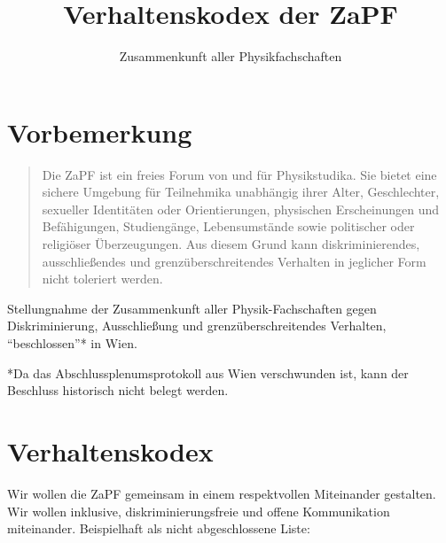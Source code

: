 \documentclass[
  a4paper,
  oneside]{scrartcl}
\title{Verhaltenskodex der ZaPF}
\author{Zusammenkunft aller Physikfachschaften}
\date{}
\begin{document}
\maketitle

\section{Vorbemerkung}\label{vorbemerkung}

\begin{quote}
Die ZaPF ist ein freies Forum von und für Physikstudika. Sie bietet eine
sichere Umgebung für Teilnehmika unabhängig ihrer Alter, Geschlechter,
sexueller Identitäten oder Orientierungen, physischen Erscheinungen und
Befähigungen, Studiengänge, Lebensumstände sowie politischer oder
religiöser Überzeugungen. Aus diesem Grund kann diskriminierendes,
ausschließendes und grenzüberschreitendes Verhalten in jeglicher Form
nicht toleriert werden.
\end{quote}

Stellungnahme der Zusammenkunft aller Physik-Fachschaften gegen
Diskriminierung, Ausschließung und grenzüberschreitendes Verhalten,
``beschlossen''* in Wien.

*Da das Abschlussplenumsprotokoll aus Wien verschwunden ist, kann der
Beschluss historisch nicht belegt werden.

\section{Verhaltenskodex}\label{verhaltenskodex}

Wir wollen die ZaPF gemeinsam in einem respektvollen Miteinander
gestalten. Wir wollen inklusive, diskriminierungsfreie und offene
Kommunikation miteinander. Beispielhaft als nicht abgeschlossene Liste:
\end{document}
